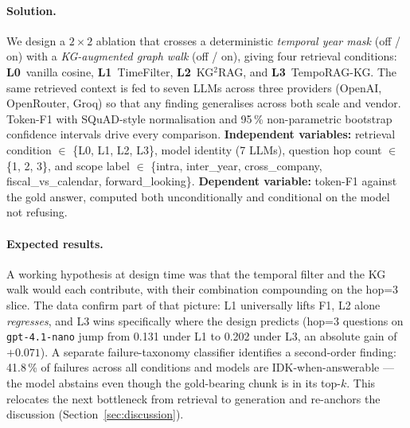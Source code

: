 \documentclass[11pt]{article}
\begin{document}
\paragraph{Solution.}
We design a $2\times2$ ablation that crosses a deterministic
\textit{temporal year mask} (off / on) with a \textit{KG-augmented graph
walk} (off / on), giving four retrieval conditions: \textbf{L0}~vanilla
cosine, \textbf{L1}~TimeFilter, \textbf{L2}~KG$^{2}$RAG, and
\textbf{L3}~TempoRAG-KG. The same retrieved context is fed to seven
LLMs across three providers (OpenAI, OpenRouter, Groq) so that any
finding generalises across both scale and vendor. Token-F1 with
SQuAD-style normalisation and 95\,\% non-parametric bootstrap
confidence intervals \citep{efron1979bootstrap} drive every comparison.
\textbf{Independent variables:} retrieval condition $\in$ \{L0, L1, L2,
L3\}, model identity (7 LLMs), question hop count $\in$ \{1, 2, 3\},
and scope label $\in$ \{intra, inter\_year, cross\_company,
fiscal\_vs\_calendar, forward\_looking\}. \textbf{Dependent variable:}
token-F1 against the gold answer, computed both unconditionally and
conditional on the model not refusing.

\paragraph{Expected results.}
A working hypothesis at design time was that the temporal filter and
the KG walk would each contribute, with their combination compounding
on the hop=3 slice. The data confirm part of that picture: L1
universally lifts F1, L2 alone \emph{regresses}, and L3 wins
specifically where the design predicts (hop=3 questions on
\texttt{gpt-4.1-nano} jump from 0.131 under L1 to 0.202 under L3, an
absolute gain of $+0.071$). A separate failure-taxonomy classifier
identifies a second-order finding: 41.8\,\% of failures across all
conditions and models are IDK-when-answerable --- the model abstains
even though the gold-bearing chunk is in its top-$k$. This relocates
the next bottleneck from retrieval to generation and re-anchors the
discussion (Section~\ref{sec:discussion}).
\end{document}

